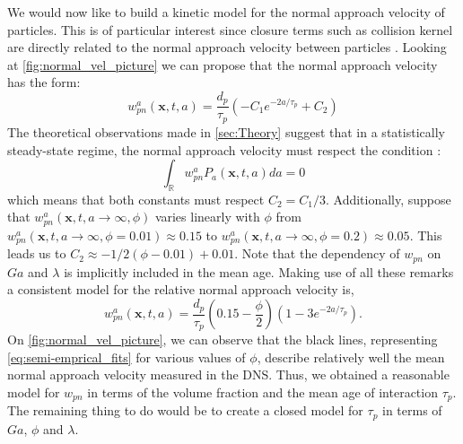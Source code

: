 We would now like to build a kinetic model for the normal approach velocity of particles. 
This is of particular interest since closure terms such as collision kernel are directly related to the normal approach velocity between particles \citep{sundaram1997collision}.
Looking at \ref{fig:normal_vel_picture} we can propose that the normal approach velocity has the form:
\begin{equation}
    w_{pn}^a(\textbf{x},t,a) = \frac{d_p}{\tau_p} \left(
        - C_1 e^{- 2 a/\tau_p }
        + C_2
    \right)
\end{equation}
The theoretical observations made in \ref{sec:Theory} suggest that in a statistically steady-state regime, the normal approach velocity must respect the condition :
\begin{equation}
\int_\mathbb{R} w_{pn}^aP_a(\textbf{x},t,a) da = 0 
\end{equation}
which means that both constants must respect $C_2 = C_1 /3$. 
Additionally, suppose that $w_{pn}^a(\textbf{x},t,a\to\infty,\phi)$ varies linearly with $\phi$ from $w_{pn}^a(\textbf{x},t,a\to\infty,\phi = 0.01) \approx 0.15$ to $w_{pn}^a(\textbf{x},t,a\to\infty,\phi = 0.2) \approx 0.05$. 
This leads us to $C_2 \approx -1/2 (\phi - 0.01) + 0.01$. 
Note that the dependency of $w_{pn}$ on $Ga$ and $\lambda$ is implicitly included in the mean age.
Making use of all these remarks a consistent model for the relative normal approach velocity is, 
\begin{equation}
    w_{pn}^a(\textbf{x},t,a) = \frac{d_p}{\tau_p} 
    \left(
        0.15
        -\frac{\phi}{2}
    \right)\left(
        1 - 3e^{-2a/\tau_p}
    \right).
   \label{eq:semi-emprical_fits}
\end{equation}
On \ref{fig:normal_vel_picture}, we can observe that the black lines, representing \ref{eq:semi-emprical_fits} for various values of $\phi$, describe relatively well the mean normal approach velocity measured in the DNS. 
Thus, we obtained a reasonable model for $w_{pn}$ in terms of the volume fraction and the mean age of interaction $\tau_p$.
The remaining thing to do would be to create a closed model for $\tau_p$ in terms of $Ga$, $\phi$ and $\lambda$. 

